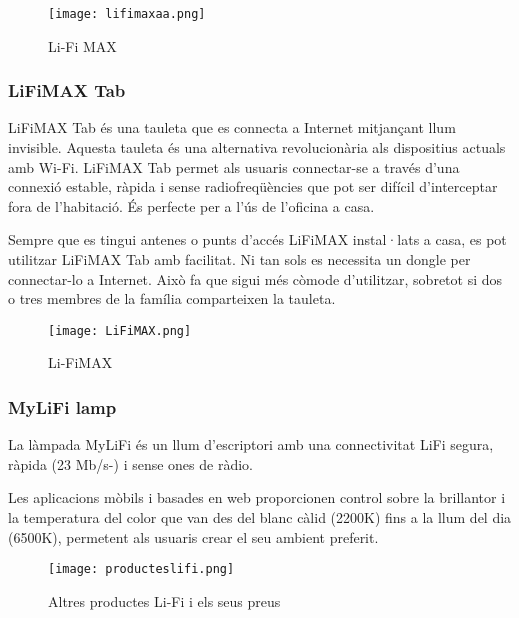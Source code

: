 \begin{figure}[h!]
    \centering
    \texttt{[image: lifimaxaa.png]}
    \caption{Li-Fi MAX}
\end{figure}

\subsubsection*{LiFiMAX Tab}

LiFiMAX Tab és una tauleta que es connecta a Internet mitjançant llum invisible. Aquesta tauleta és una alternativa revolucionària als dispositius actuals amb Wi-Fi. LiFiMAX Tab permet als usuaris connectar-se a través d'una connexió estable, ràpida i sense radiofreqüències que pot ser difícil d'interceptar fora de l'habitació. És perfecte per a l'ús de l'oficina a casa.

Sempre que es tingui antenes o punts d'accés LiFiMAX instal·lats a casa, es pot utilitzar LiFiMAX Tab amb facilitat. Ni tan sols es necessita un dongle per connectar-lo a Internet. Això fa que sigui més còmode d'utilitzar, sobretot si dos o tres membres de la família comparteixen la tauleta. 


\begin{figure}[h!]
    \centering
    \texttt{[image: LiFiMAX.png]}
    \caption{Li-FiMAX}
\end{figure}


\subsubsection*{MyLiFi lamp}

La làmpada MyLiFi és un llum d'escriptori amb una connectivitat LiFi segura, ràpida (23 Mb/s-) i sense ones de ràdio.

Les aplicacions mòbils i basades en web proporcionen control sobre la brillantor i la temperatura del color que van des del blanc càlid (2200K) fins a la llum del dia (6500K), permetent als usuaris crear el seu ambient preferit.


\begin{figure}[h!]
    \centering
    \texttt{[image: producteslifi.png]}
    \caption{Altres productes Li-Fi i els seus preus}
\end{figure}